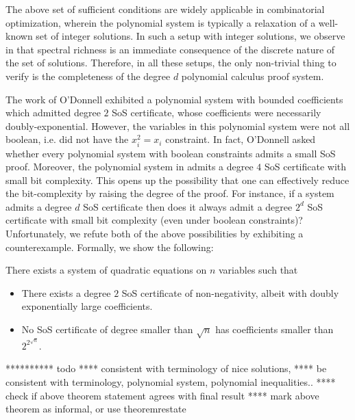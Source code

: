 The above set of sufficient conditions are widely applicable in combinatorial optimization, wherein the polynomial system is typically a relaxation of a well-known set of integer solutions.  
%
In such a setup with integer solutions, we observe in  that spectral richness is an immediate consequence of the discrete nature of the set of solutions.
%
Therefore, in all these setups, the only non-trivial thing to verify is the completeness of the degree $d$ polynomial calculus proof system.
%


The work of O'Donnell \cite{odonnell17} exhibited a polynomial system with bounded coefficients which admitted degree $2$ SoS certificate, whose coefficients were necessarily doubly-exponential.
%
However, the variables in this polynomial system were not all boolean, i.e. did not have the $x_i^2 = x_i$ constraint.
%
In fact, O'Donnell asked whether every polynomial system with boolean constraints admits a small SoS proof.
%
Moreover, the polynomial system in \cite{odonnell17} admits a degree $4$ SoS certificate with small bit complexity.  
%
This opens up the possibility that one can effectively reduce the bit-complexity by raising the degree of the proof.
%
For instance, if a system admits a degree $d$ SoS certificate then does it always admit a degree $2^d$ SoS certificate with small bit complexity (even under boolean constraints)?
Unfortunately, we refute both of the above possibilities by exhibiting a counterexample.
%
Formally, we show the following:

\begin{theorem}
	There exists a system of quadratic equations on $n$ variables such that
	\begin{itemize}
	\item There exists a degree $2$ SoS certificate of non-negativity, albeit with doubly exponentially large coefficients.
	\item No SoS certificate of degree smaller than $\sqrt{n}$ has coefficients smaller than $2^{2^{\sqrt{n}}}$.
	\end{itemize}	
\end{theorem}

********** todo
**** consistent with terminology of nice solutions, 
**** be consistent with terminology, polynomial system, polynomial inequalities..
**** check if above theorem statement agrees with final result
**** mark above theorem as informal, or use theoremrestate 



